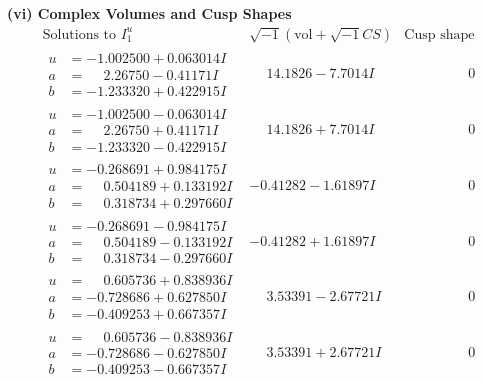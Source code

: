 \documentclass[1p]{elsarticle_modified}
\theoremstyle{definition}
\newcommand{\I}{\sqrt{-1}}
\begin{document}
\newpage\flushleft \textbf{(vi) Complex Volumes and Cusp Shapes}
$$\begin{array}{c|c|c}  
\text{Solutions to }I^u_{1}& \I (\text{vol} + \sqrt{-1}CS) & \text{Cusp shape}\\
 \hline 
\begin{aligned}
u &= -1.002500 + 0.063014 I \\
a &= \phantom{-}2.26750 - 0.41171 I \\
b &= -1.233320 + 0.422915 I\end{aligned}
 & \phantom{-}14.1826 - 7.7014 I & \phantom{-0.000000 } 0 \\ \hline\begin{aligned}
u &= -1.002500 - 0.063014 I \\
a &= \phantom{-}2.26750 + 0.41171 I \\
b &= -1.233320 - 0.422915 I\end{aligned}
 & \phantom{-}14.1826 + 7.7014 I & \phantom{-0.000000 } 0 \\ \hline\begin{aligned}
u &= -0.268691 + 0.984175 I \\
a &= \phantom{-}0.504189 + 0.133192 I \\
b &= \phantom{-}0.318734 + 0.297660 I\end{aligned}
 & -0.41282 - 1.61897 I & \phantom{-0.000000 } 0 \\ \hline\begin{aligned}
u &= -0.268691 - 0.984175 I \\
a &= \phantom{-}0.504189 - 0.133192 I \\
b &= \phantom{-}0.318734 - 0.297660 I\end{aligned}
 & -0.41282 + 1.61897 I & \phantom{-0.000000 } 0 \\ \hline\begin{aligned}
u &= \phantom{-}0.605736 + 0.838936 I \\
a &= -0.728686 + 0.627850 I \\
b &= -0.409253 + 0.667357 I\end{aligned}
 & \phantom{-}3.53391 - 2.67721 I & \phantom{-0.000000 } 0 \\ \hline\begin{aligned}
u &= \phantom{-}0.605736 - 0.838936 I \\
a &= -0.728686 - 0.627850 I \\
b &= -0.409253 - 0.667357 I\end{aligned}
 & \phantom{-}3.53391 + 2.67721 I & \phantom{-0.000000 } 0 \\ \hline\begin{aligned}

\end{aligned}
\end{array}$$
\end{document}
